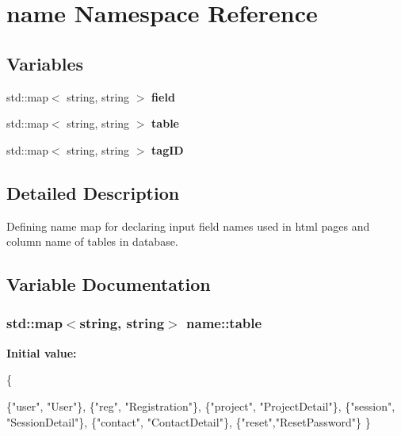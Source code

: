 \hypertarget{namespacename}{\section{name Namespace Reference}
\label{namespacename}
}
\subsection*{Variables}
\begin{DoxyCompactItemize}
\item 
\hypertarget{namespacename_ade348f92c1fe0d4168af8a49716bd048}{std\-::map$<$ string, string $>$ {\bfseries field}}\label{namespacename_ade348f92c1fe0d4168af8a49716bd048}

\item 
std\-::map$<$ string, string $>$ {\bfseries table}
\item 
std\-::map$<$ string, string $>$ {\bfseries tag\-I\-D}
\end{DoxyCompactItemize}


\subsection{Detailed Description}
Defining name map for declaring input field names used in html pages and column name of tables in database. 

\subsection{Variable Documentation}
\hypertarget{namespacename_a5fd14250e6493f4590c559c40a1428f8}{
\subsubsection[{table}]{\setlength{\rightskip}{0pt plus 5cm}std\-::map$<$string, string$>$ name\-::table}}\label{namespacename_a5fd14250e6493f4590c559c40a1428f8}
{\bfseries Initial value\-:}
\begin{DoxyCode}
 
    \{

        

        \{\textcolor{stringliteral}{"user"}, \textcolor{stringliteral}{"User"}\},
        \{\textcolor{stringliteral}{"reg"}, \textcolor{stringliteral}{"Registration"}\},
        \{\textcolor{stringliteral}{"project"}, \textcolor{stringliteral}{"ProjectDetail"}\},
        \{\textcolor{stringliteral}{"session"}, \textcolor{stringliteral}{"SessionDetail"}\},
        \{\textcolor{stringliteral}{"contact"}, \textcolor{stringliteral}{"ContactDetail"}\},
        \{\textcolor{stringliteral}{"reset"},\textcolor{stringliteral}{"ResetPassword"}\}
    \}
\end{DoxyCode}


